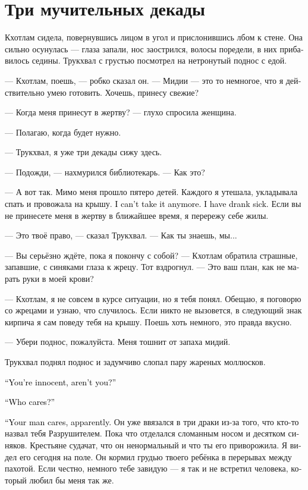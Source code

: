 \documentclass[a4paper,12pt,fleqn]{book}\usepackage{cooltooltips}\usepackage{polyglossia}\setdefaultlanguage{russian}\setotherlanguage{english}\defaultfontfeatures{Ligatures=TeX,Mapping=tex-text} \usepackage{xcolor}\definecolor{lightgray}{HTML}{bbbbbb}\color{lightgray}\newcommand{\ml}[3]{\textenglish{\textcolor{black}{#3}}}
\begin{document}
\section{Три мучительных декады}

Кхотлам сидела, повернувшись лицом в угол и прислонившись лбом к стене.
Она сильно осунулась --- глаза запали, нос заострился, волосы поредели, в них прибавилось седины.
Трукхвал с грустью посмотрел на нетронутый поднос с едой.

--- Кхотлам, поешь, --- робко сказал он.
--- Мидии --- это то немногое, что я действительно умею готовить.
Хочешь, принесу свежие?

--- Когда меня принесут в жертву? --- глухо спросила женщина.

--- Полагаю, когда будет нужно.

--- Трукхвал, я уже три декады сижу здесь.

--- Подожди, --- нахмурился библиотекарь.
--- Как это?

--- А вот так.
Мимо меня прошло пятеро детей.
Каждого я утешала, укладывала спать и провожала на крышу.
\ml{$0$}
{Я больше так не могу.}
{I can't take it anymore.}
\ml{$0$}
{С меня хватит.}
{I have drank sick.}
Если вы не принесете меня в жертву в ближайшее время, я перережу себе жилы.

--- Это твоё право, --- сказал Трукхвал.
--- Как ты знаешь, мы...

--- Вы серьёзно ждёте, пока я покончу с собой? --- Кхотлам обратила страшные, запавшие, с синяками глаза к жрецу.
Тот вздрогнул.
--- Это ваш план, как не марать руки в моей крови?

--- Кхотлам, я не совсем в курсе ситуации, но я тебя понял.
Обещаю, я поговорю со жрецами и узнаю, что случилось.
Если никто не вызовется, в следующий знак кирпича я сам поведу тебя на крышу.
Поешь хоть немного, это правда вкусно.

--- Убери поднос, пожалуйста.
Меня тошнит от запаха мидий.

Трукхвал поднял поднос и задумчиво слопал пару жареных моллюсков.

\ml{$0$}
{--- Ты же ведь невиновна, да?}
{``You're innocent, aren't you?''}

\ml{$0$}
{--- Какая теперь разница?}
{``Who cares?''}

\ml{$0$}
{--- Для твоего мужчины, видимо, есть разница.}
{``Your man cares, apparently.}
Он уже ввязался в три драки из-за того, что кто-то назвал тебя Разрушителем.
Пока что отделался сломанным носом и десятком синяков.
Крестьяне судачат, что он ненормальный и что ты его приворожила.
Я видел его сегодня на поле.
Он кормил грудью твоего ребёнка в перерывах между пахотой.
Если честно, немного тебе завидую --- я так и не встретил человека, который любил бы меня так же.
\end{document}
